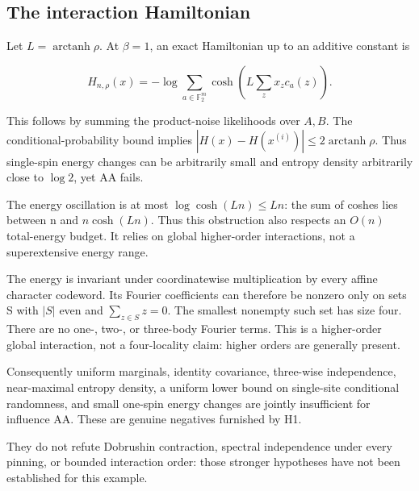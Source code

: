 \subsection{The interaction
Hamiltonian}\label{proof:higher_order_obstructions:the-interaction-hamiltonian}

Let \(L = \operatorname{arctanh} \rho\). At \(\beta  = 1\), an exact
Hamiltonian up to an additive constant is

\[
H_{n,\rho}(x)=-\log\sum_{a\in\mathbb F_2^m}
\cosh\left(L\sum_z x_zc_a(z)\right). \tag{H2}
\]

This follows by summing the product-noise likelihoods over \(A,B\). The
conditional-probability bound implies
\(|H(x)-H(x^{(i)})| \le  2 \operatorname{arctanh} \rho\). Thus
single-spin energy changes can be arbitrarily small and entropy density
arbitrarily close to \(\log  2\), yet AA fails.

The energy oscillation is at most \(\log  \cosh (Ln) \le  Ln\): the sum
of coshes lies between n and \(n \cosh (Ln)\). Thus this obstruction
also respects an \(O(n)\) total-energy budget. It relies on global
higher-order interactions, not a superextensive energy range.

The energy is invariant under coordinatewise multiplication by every
affine character codeword. Its Fourier coefficients can therefore be
nonzero only on sets S with \(|S|\) even and \(\sum_{z\in S}z=0\). The
smallest nonempty such set has size four. There are no one-, two-, or
three-body Fourier terms. This is a higher-order global interaction, not
a four-locality claim: higher orders are generally present.

Consequently uniform marginals, identity covariance, three-wise
independence, near-maximal entropy density, a uniform lower bound on
single-site conditional randomness, and small one-spin energy changes
are jointly insufficient for influence AA. These are genuine negatives
furnished by H1.

They do not refute Dobrushin contraction, spectral independence under
every pinning, or bounded interaction order: those stronger hypotheses
have not been established for this example.
